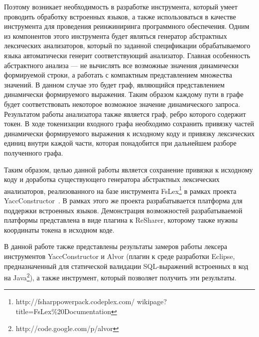 Поэтому возникает необходимость в разработке инструмента, который умеет проводить обработку встроенных языков, а также использоваться
в качестве инструмента для проведения реинжиниринга программного обеспечения. Одним из компонентов этого инструмента будет 
являться генератор абстрактных лексических анализаторов, который по заданной спецификации обрабатываемого языка автоматически генерит 
соответствующий  анализатор. Главная особенность абстрактного анализа –-- не вычислять все возможные значения динамически формируемой 
строки, а работать с компактным представлением множества значений.   В данном случае это будет граф, являющийся представлением динамически 
формируемого выражения.  Таким образом каждому пути в графе будет соответствовать некоторое возможное значение динамического запроса.
Результатом работы анализатора также является граф, ребро которого содержит токен. В ходе токенизации входного графа необходимо сохранить 
привязку частей динамически формируемого выражения к исходному коду и привязку лексических единиц внутри каждой части, которая понадобится 
при дальнейшем разборе полученного графа. 

Таким образом, целью данной работы является сохранение привязки к исходному коду и доработка существующего генератора абстрактных лексических 
анализаторов, реализованного на базе инструмента FsLex\footnote{http://fsharppowerpack.codeplex.com/ wikipage?title=FsLex\%20Documentation} 
в рамках проекта YaccConstructor~\cite{YC_article}. В рамках этого же проекта разрабатывается платформа для поддержки встроенных языков. 
Демонстрация возможностей разрабатываемой платформы представлена в виде плагина к ReSharer, которому также нужны координаты токена в 
исходном коде. 

В данной работе также представлены результаты замеров работы лексера инструментов YaccConstructor и Alvor (плагин к среде разработки Eclipse,
предназначенный для статической валидации SQL-выражений встроенных в код на Java\footnote{http://code.google.com/p/alvor}), а также инструмент, который позволяет получить 
эти результаты.


